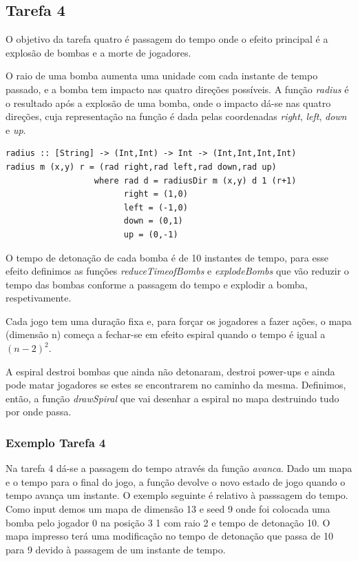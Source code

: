\documentclass[a4paper]{article}
\begin{document}
\subsection{Tarefa 4} O objetivo da tarefa quatro é passagem do tempo onde o efeito principal é a explosão de bombas e a morte de jogadores.\par O raio de uma bomba aumenta uma unidade com cada instante de tempo passado, e a bomba tem impacto nas quatro direções possíveis. A função \emph{radius} é o resultado após a explosão de uma bomba, onde o impacto dá-se nas quatro direções, cuja representação na função é dada pelas coordenadas \emph{right}, \emph{left}, \emph{down} e \emph{up}.

\begin{verbatim}
radius :: [String] -> (Int,Int) -> Int -> (Int,Int,Int,Int)
radius m (x,y) r = (rad right,rad left,rad down,rad up)
                  where rad d = radiusDir m (x,y) d 1 (r+1)
                        right = (1,0)
                        left = (-1,0)
                        down = (0,1)
                        up = (0,-1)
\end{verbatim}

\vspace{0.5cm}

O tempo de detonação de cada bomba é de 10 instantes de tempo, para esse efeito definimos as funções \emph{reduceTimeofBombs} e \emph{explodeBombs} que vão reduzir o tempo das bombas conforme a passagem do tempo e explodir a bomba, respetivamente.\par Cada jogo tem uma duração fixa e, para forçar os jogadores a fazer ações, o mapa (dimensão n) começa a fechar-se em efeito espiral quando o tempo é igual a $(n-2)^2$.\par  A espiral destroi bombas que ainda não detonaram, destroi power-ups e ainda pode matar jogadores se estes se encontrarem no caminho da mesma. Definimos, então, a função \emph{drawSpiral} que vai desenhar a espiral no mapa destruindo tudo por onde passa.

\vspace{0.5cm}

\subsubsection{Exemplo Tarefa 4}
Na tarefa 4 dá-se a passagem do tempo através da função \emph{avanca}. Dado um mapa e o tempo para o final do jogo, a função devolve o novo estado de jogo quando o tempo avança um instante. 
O exemplo seguinte é relativo à passsagem do tempo. Como input demos um mapa de dimensão 13 e seed 9 onde foi colocada uma bomba pelo jogador 0 na posição 3 1 com raio 2 e tempo de detonação 10. O mapa impresso terá uma modificação no tempo de detonação que passa de 10 para 9 devido à passagem de um instante de tempo.
\end{document}
